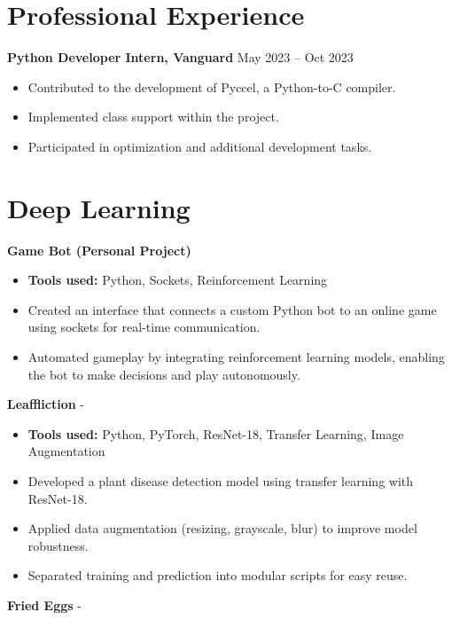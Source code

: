 \documentclass[a4paper,11pt]{article}%
\begin{document}
\section*{Professional Experience}%
\textbf{Python Developer Intern, Vanguard} \hfill May 2023 -- Oct 2023%
\begin{itemize}[leftmargin=*]%
\item Contributed to the development of Pyccel, a Python-to-C compiler.%
\item Implemented class support within the project.%
\item Participated in optimization and additional development tasks.%
\end{itemize}%
\section*{Deep Learning}%
%
\noindent \textbf{Game Bot (Personal Project)}%
\begin{itemize}[leftmargin=2em,label={},parsep=0pt,topsep=1em]%
\item \textbf{Tools used:} Python, Sockets, Reinforcement Learning%
\item Created an interface that connects a custom Python bot to an online game using sockets for real-time communication.%
\item Automated gameplay by integrating reinforcement learning models, enabling the bot to make decisions and play autonomously.%
\end{itemize}%
%
\noindent \textbf{Leaffliction} - \href{https://github.com/sboof911/Leaffliction}{{}}%
\begin{itemize}[leftmargin=2em,label={},parsep=0pt,topsep=1em]%
\item \textbf{Tools used:} Python, PyTorch, ResNet-18, Transfer Learning, Image Augmentation%
\item Developed a plant disease detection model using transfer learning with ResNet-18.%
\item Applied data augmentation (resizing, grayscale, blur) to improve model robustness.%
\item Separated training and prediction into modular scripts for easy reuse.%
\end{itemize}%
%
\noindent \textbf{Fried Eggs} - \href{https://github.com/sboof911/Fried-eggs}{{}}%
\end{document}
